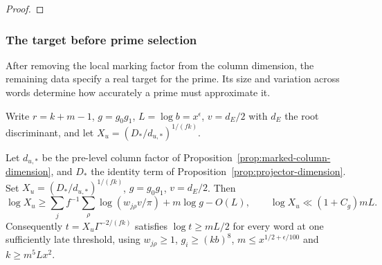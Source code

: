 \begin{proof}
\end{proof}

\subsubsection{The target before prime selection}

After removing the local marking factor from the column dimension, the remaining data specify a real target for the prime. Its size and variation across words determine how accurately a prime must approximate it.

Write \(r=k+m-1\), \(g=g_0g_1\), \(L=\log b=x^\epsilon\),
\(v=d_E/2\) with \(d_E\) the root discriminant, and let
\(X_u=(D_*/d_{u,*})^{1/(fk)}\).

\begin{proposition}\label{prop:prime-target-size}
Let \(d_{u,*}\) be the pre-level column factor of
Proposition~\ref{prop:marked-column-dimension}, and \(D_*\) the
identity term of Proposition~\ref{prop:projector-dimension}.
Set \(X_u=(D_*/d_{u,*})^{1/(fk)}\), \(g=g_0g_1\), \(v=d_E/2\).
Then
\[
 \log X_u\ge \sum_j f^{-1}\sum_\rho\log(w_{j\rho}v/\pi)+m\log g-O(L),
 \qquad \log X_u\ll(1+C_g)mL.
\]
Consequently \(t=X_u\Gamma^{-2/(fk)}\) satisfies \(\log t\ge mL/2\)
for every word at one sufficiently late threshold, using
\(w_{j\rho}\ge1\), \(g_i\ge(kb)^8\),
\(m\le x^{1/2+\epsilon/100}\) and \(k\ge m^5 Lx^2\).
\end{proposition}

